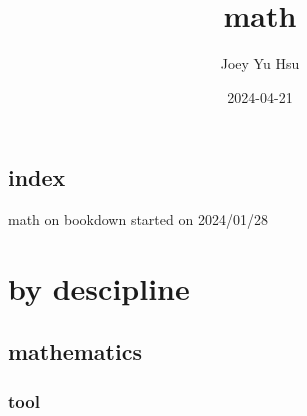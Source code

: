 \documentclass[
]{book}
\title{math}
\author{Joey Yu Hsu}
\date{2024-04-21}
\theoremstyle{definition}
\theoremstyle{definition}
\theoremstyle{definition}
\theoremstyle{definition}
\theoremstyle{remark}
\begin{document}
\maketitle

{
\hypersetup{linkcolor=}
\setcounter{tocdepth}{4}
\tableofcontents
}
\hypertarget{index}{%
\chapter*{index}\label{index}}

math on bookdown started on 2024/01/28

\hypertarget{part-by-descipline}{%
\part{by descipline}\label{part-by-descipline}}

\hypertarget{mathematics}{%
\chapter{mathematics}\label{mathematics}}

\hypertarget{tool}{%
\section{tool}\label{tool}}
\end{document}
